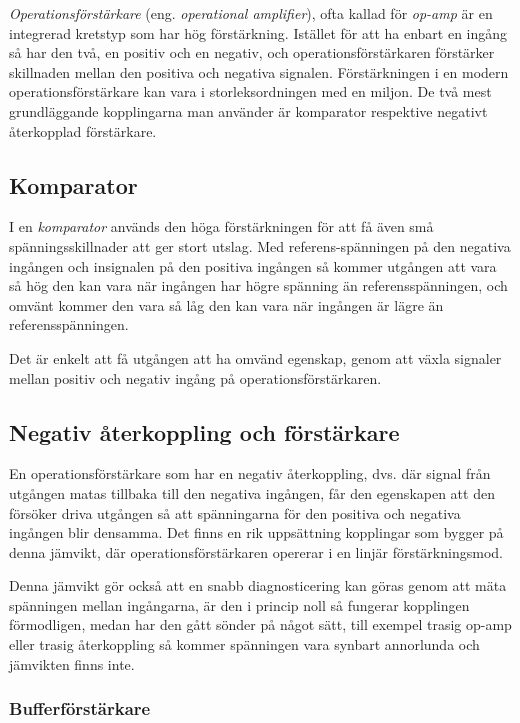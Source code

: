 \emph{Operationsförstärkare} (eng. \emph{operational amplifier}), ofta kallad
för \emph{op-amp} är en integrerad kretstyp som har hög förstärkning.
Istället för att ha enbart en ingång så har den två, en positiv
och en negativ, och operationsförstärkaren förstärker skillnaden mellan den
positiva och negativa signalen. Förstärkningen i en modern operationsförstärkare
kan vara i storleksordningen med en miljon.
De två mest grundläggande kopplingarna man använder är komparator respektive
negativt återkopplad förstärkare.

\subsection{Komparator}

I en \emph{komparator} används den höga förstärkningen för att få även små
spänningsskillnader att ger stort utslag. Med referens-spänningen på den
negativa ingången och insignalen på den positiva ingången så kommer utgången
att vara så hög den kan vara när ingången har högre spänning än
referensspänningen, och omvänt kommer den vara så låg den kan vara när ingången
är lägre än referensspänningen.

Det är enkelt att få utgången att ha omvänd egenskap, genom att växla signaler
mellan positiv och negativ ingång på operationsförstärkaren.

\subsection{Negativ återkoppling och förstärkare}

En operationsförstärkare som har en negativ återkoppling, dvs. där signal från
utgången matas tillbaka till den negativa ingången, får den egenskapen att den
försöker driva utgången så att spänningarna för den positiva och negativa
ingången blir densamma.
Det finns en rik uppsättning kopplingar som bygger på denna jämvikt, där
operationsförstärkaren opererar i en linjär förstärkningsmod.

Denna jämvikt gör också att en snabb diagnosticering kan göras genom att mäta
spänningen mellan ingångarna, är den i princip noll så fungerar kopplingen
förmodligen, medan har den gått sönder på något sätt, till exempel trasig op-amp
eller trasig återkoppling så kommer spänningen vara synbart annorlunda och
jämvikten finns inte.

\subsubsection{Bufferförstärkare}

